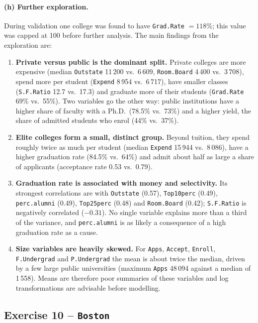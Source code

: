 \documentclass[11pt]{article}
\begin{document}
\paragraph{(h) Further exploration.}
During validation one college was found to have \texttt{Grad.Rate} $= 118\%$; this value was capped at 100 before further analysis. The main findings from the exploration are:
\begin{enumerate}
  \item \textbf{Private versus public is the dominant split.} Private colleges are more expensive (median \texttt{Outstate} 11\,200 vs.\ 6\,609, \texttt{Room.Board} 4\,400 vs.\ 3\,708), spend more per student (\texttt{Expend} 8\,954 vs.\ 6\,717), have smaller classes (\texttt{S.F.Ratio} 12.7 vs.\ 17.3) and graduate more of their students (\texttt{Grad.Rate} 69\% vs.\ 55\%). Two variables go the other way: public institutions have a higher share of faculty with a Ph.D.\ (78.5\% vs.\ 73\%) and a higher yield, the share of admitted students who enrol (44\% vs.\ 37\%).
  \item \textbf{Elite colleges form a small, distinct group.} Beyond tuition, they spend roughly twice as much per student (median \texttt{Expend} 15\,944 vs.\ 8\,086), have a higher graduation rate (84.5\% vs.\ 64\%) and admit about half as large a share of applicants (acceptance rate 0.53 vs.\ 0.79).
  \item \textbf{Graduation rate is associated with money and selectivity.} Its strongest correlations are with \texttt{Outstate} (0.57), \texttt{Top10perc} (0.49), \texttt{perc.alumni} (0.49), \texttt{Top25perc} (0.48) and \texttt{Room.Board} (0.42); \texttt{S.F.Ratio} is negatively correlated ($-0.31$). No single variable explains more than a third of the variance, and \texttt{perc.alumni} is as likely a consequence of a high graduation rate as a cause.
  \item \textbf{Size variables are heavily skewed.} For \texttt{Apps}, \texttt{Accept}, \texttt{Enroll}, \texttt{F.Undergrad} and \texttt{P.Undergrad} the mean is about twice the median, driven by a few large public universities (maximum \texttt{Apps} 48\,094 against a median of 1\,558). Means are therefore poor summaries of these variables and log transformations are advisable before modelling.
\end{enumerate}

\subsection*{Exercise 10 -- \texttt{Boston}}
\end{document}
